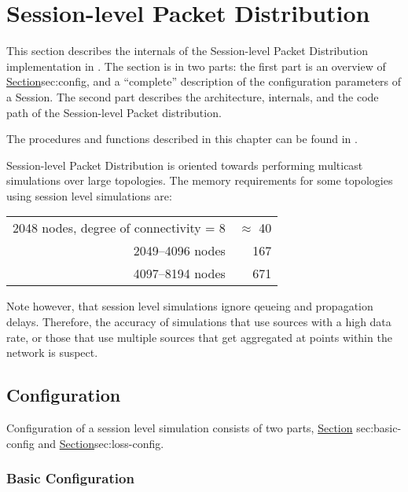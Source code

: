 \chapter{Session-level Packet Distribution}
\label{chap:session}

This section describes the internals of the Session-level Packet Distribution
implementation in \ns.
The section is in two parts:
the first part is an overview of 
\href{Session configuration}{Section}{sec:config},
and a ``complete'' description of the configuration parameters 
of a Session.
The second part describes the architecture, internals, and the code path
of the Session-level Packet distribution.

The procedures and functions described in this chapter can be found in
.

Session-level Packet Distribution is oriented towards
performing multicast simulations over large topologies.
The memory requirements for some topologies using
session level simulations are:

\begin{tabular}{r @{~~~$approx$~} r@{\,MB}}
2048 nodes, degree of connectivity = 8 & $\approx$ 40 \\
2049--4096 nodes & 167 \\
4097--8194 nodes & 671 \\
\end{tabular}

Note however, that session level simulations ignore qeueing and
propagation delays.
Therefore, the accuracy of
simulations that use sources with a high data rate,
or those that use multiple sources that get aggregated at points
within the network is suspect.

\section{Configuration}
\label{sec:config}

Configuration of a session level simulation consists of two parts,
\href{configuration of the session level details themselves}{Section}{%
	sec:basic-config}
and 
\href{adding loss and error models to the session level abstraction
to model specific behaviours}{Section}{sec:loss-config}.

\subsection{Basic Configuration}
\label{sec:basic-config}


